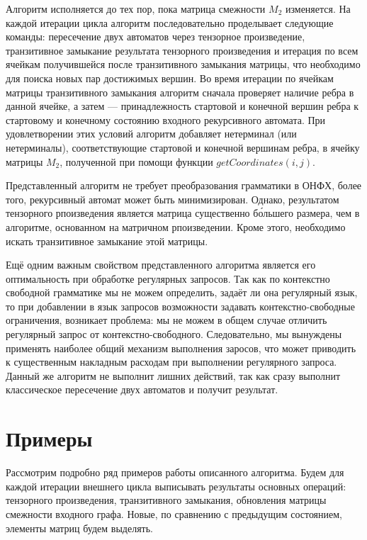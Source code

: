 Алгоритм исполняется до тех пор, пока матрица смежности $M_2$ изменяется.
На каждой итерации цикла алгоритм последовательно проделывает следующие команды: пересечение двух автоматов через тензорное произведение, транзитивное замыкание результата тензорного произведения и итерация по всем ячейкам получившейся после транзитивного замыкания матрицы, что необходимо для поиска новых пар достижимых вершин.
Во время итерации по ячейкам матрицы транзитивного замыкания алгоритм сначала проверяет наличие ребра в данной ячейке, а затем --- принадлежность стартовой и конечной вершин ребра к стартовому и конечному состоянию входного рекурсивного автомата.
При удовлетворении этих условий алгоритм добавляет нетерминал (или нетерминалы), соответствующие стартовой и конечной вершинам ребра, в ячейку матрицы $M_2$, полученной при помощи функции $getCoordinates(i,j)$.

Представленный алгоритм не требует преобразования грамматики в ОНФХ, более того, рекурсивный автомат может быть минимизирован. Однако, результатом тензорного рпоизведения является матрица существенно б\'{о}льшего размера, чем в алгоритме, основанном на матричном рпоизведении.
Кроме этого, необходимо искать транзитивное замыкание этой матрицы.

Ещё одним важным свойством представленного алгоритма является его оптимальность при обработке регулярных запросов.
Так как по контекстно свободной грамматике мы не можем определить, задаёт ли она регулярный язык, то при добавлении в язык запросов возможности задавать контекстно-свободные ограничения, возникает проблема: мы не можем в общем случае отличить регулярный запрос от контекстно-свободного. Следовательно, мы вынуждены применять наиболее общий механизм выполнения заросов, что может приводить к существенным накладным расходам при выполнении регулярного запроса.
Данный же алгоритм не выполнит лишних действий, так как сразу выполнит классическое пересечение двух автоматов и получит результат.

\section{Примеры}

Рассмотрим подробно ряд примеров работы описанного алгоритма.
Будем для каждой итерации внешнего цикла выписывать результаты основных операций: тензорного произведения, транзитивного замыкания, обновления матрицы смежности входного графа.
Новые, по сравнению с предыдущим состоянием, элементы матриц будем выделять.


